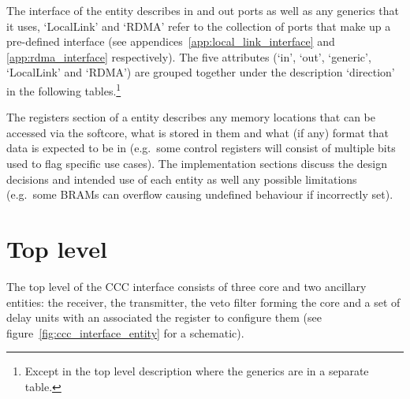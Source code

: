 The interface of the entity describes in and out ports as well as any generics that it uses, `LocalLink' and `RDMA' refer to the collection of ports that make up a pre-defined interface (see appendices~\ref{app:local_link_interface} and \ref{app:rdma_interface} respectively). The five attributes (`in', `out', `generic', `LocalLink' and `RDMA') are grouped together under the description `direction' in the following tables.\footnote{Except in the top level description where the generics are in a separate table.}

The registers section of a entity describes any memory locations that can be accessed via the softcore, what is stored in them and what (if any) format that data is expected to be in (e.g.\ some control registers will consist of multiple bits used to flag specific use cases). The implementation sections discuss the design decisions and intended use of each entity as well any possible limitations (e.g.\ some BRAMs can overflow causing undefined behaviour if incorrectly set).

\section{Top level} %
\label{sec:top_level}
The top level of the CCC interface consists of three core and two ancillary entities: the receiver, the transmitter, the veto filter forming the core and a set of delay units with an associated the register to configure them (see figure~\ref{fig:ccc_interface_entity} for a schematic). 
